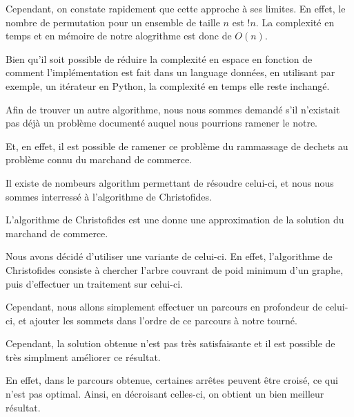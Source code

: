 \documentclass{article}
\begin{document}
  Cependant, on constate rapidement que cette approche à ses limites. En effet, le nombre de permutation pour un ensemble de taille $n$ est $!n$. La complexité en temps et en mémoire de notre alogrithme est donc de $O(n)$.

  Bien qu'il soit possible de réduire la complexité en espace en fonction de comment l'implémentation est fait dans un language données, en utilisant par exemple, un itérateur en Python, la complexité en temps elle reste inchangé.

  Afin de trouver un autre algorithme, nous nous sommes demandé s'il n'existait pas déjà un problème documenté auquel nous pourrions ramener le notre.

  Et, en effet, il est possible de ramener ce problème du rammassage de dechets au problème connu du marchand de commerce.

  Il existe de nombeurs algorithm permettant de résoudre celui-ci, et nous nous sommes interressé à l'algorithme de Christofides.
  
  L'algorithme de Christofides est une donne une approximation de la solution du marchand de commerce.

  Nous avons décidé d'utiliser une variante de celui-ci. En effet, l'algorithme de Christofides consiste à chercher l'arbre couvrant de poid minimum d'un graphe, puis d'effectuer un traitement sur celui-ci.


  Cependant, nous allons simplement effectuer un parcours en profondeur de celui-ci, et ajouter les sommets dans l'ordre de ce parcours à notre tourné.


  Cependant, la solution obtenue n'est pas très satisfaisante et il est possible de très simplment améliorer ce résultat.


  En effet, dans le parcours obtenue, certaines arrêtes peuvent être croisé, ce qui n'est pas optimal. Ainsi, en décroisant celles-ci, on obtient un bien meilleur résultat.
\end{document}
